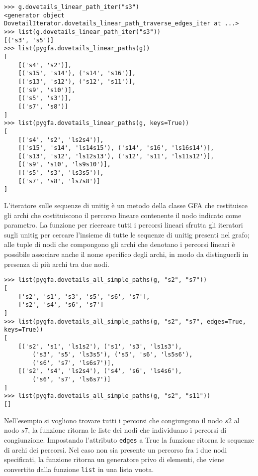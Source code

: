 \captionsetup{justification=centering, singlelinecheck=false}
\begin{minipage}{\linewidth}
\begin{lstlisting}[basicstyle=\ttfamily\scriptsize, frame=topline]
>>> g.dovetails_linear_path_iter("s3")
<generator object DovetailIterator.dovetails_linear_path_traverse_edges_iter at ...>
>>> list(g.dovetails_linear_path_iter("s3"))
[('s3', 's5')]
>>> list(pygfa.dovetails_linear_paths(g))
[
	[('s4', 's2')],
	[('s15', 's14'), ('s14', 's16')],
	[('s13', 's12'), ('s12', 's11')],
	[('s9', 's10')],
	[('s5', 's3')],
	[('s7', 's8')]
]
>>> list(pygfa.dovetails_linear_paths(g, keys=True))
[
	[('s4', 's2', 'ls2s4')], 
	[('s15', 's14', 'ls14s15'), ('s14', 's16', 'ls16s14')],
	[('s13', 's12', 'ls12s13'), ('s12', 's11', 'ls11s12')],
	[('s9', 's10', 'ls9s10')],
	[('s5', 's3', 'ls3s5')],
	[('s7', 's8', 'ls7s8')]
]
\end{lstlisting}
\end{minipage}
\captionsetup{justification=justified, singlelinecheck=false}
L'iteratore sulle sequenze di unitig è un metodo
della classe GFA che restituisce gli archi che costituiscono il percorso
lineare contenente il nodo indicato come parametro.
La funzione per ricercare tutti i percorsi lineari sfrutta
gli iteratori sugli unitig per cercare l'insieme di tutte le sequenze
di unitig presenti nel grafo; alle tuple di nodi che compongono gli archi
che denotano i percorsi lineari è possibile associare anche il nome specifico
degli archi, in modo da distinguerli in presenza di più archi tra due nodi.


\captionsetup{justification=centering, singlelinecheck=false}
\begin{minipage}{\linewidth}
\begin{lstlisting}[basicstyle=\ttfamily\scriptsize, frame=topline]
>>> list(pygfa.dovetails_all_simple_paths(g, "s2", "s7"))
[
	['s2', 's1', 's3', 's5', 's6', 's7'],
	['s2', 's4', 's6', 's7']
]
>>> list(pygfa.dovetails_all_simple_paths(g, "s2", "s7", edges=True, keys=True))
[
	[('s2', 's1', 'ls1s2'), ('s1', 's3', 'ls1s3'),
		('s3', 's5', 'ls3s5'), ('s5', 's6', 'ls5s6'),
		('s6', 's7', 'ls6s7')],
	[('s2', 's4', 'ls2s4'), ('s4', 's6', 'ls4s6'),
		('s6', 's7', 'ls6s7')]
]
>>> list(pygfa.dovetails_all_simple_paths(g, "s2", "s11"))
[]
\end{lstlisting}
\end{minipage}
\captionsetup{justification=justified, singlelinecheck=false}
Nell'esempio si vogliono trovare tutti i percorsi che congiungono
il nodo $s2$ al nodo $s7$, la funzione ritorna le liste dei nodi che individuano
i percorsi di congiunzione. Impostando l'attributo \texttt{edges}
a True la funzione ritorna le sequenze di archi dei percorsi.
Nel caso non sia presente un percorso fra i due nodi specificati, la funzione
ritorna un generatore privo di elementi, che viene convertito
dalla funzione \texttt{list} in una lista vuota.
